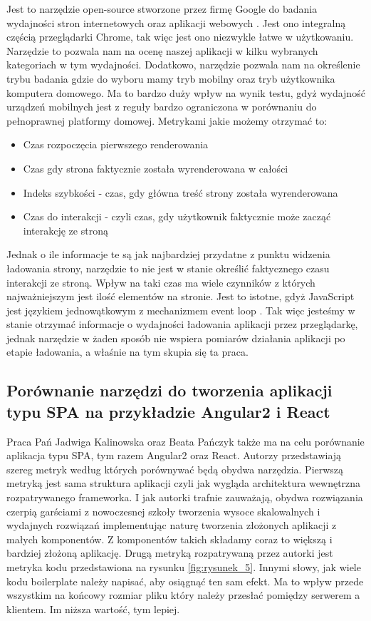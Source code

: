 Jest to narzędzie open-source stworzone przez firmę Google do badania wydajności stron internetowych oraz aplikacji webowych \cite{lighthouse}. Jest ono integralną częścią przeglądarki Chrome, tak więc jest ono niezwykle łatwe w użytkowaniu. Narzędzie to pozwala nam na ocenę naszej aplikacji w kilku wybranych kategoriach w tym wydajności. Dodatkowo, narzędzie pozwala nam na określenie trybu badania gdzie do wyboru mamy tryb mobilny oraz tryb użytkownika komputera domowego. Ma to bardzo duży wpływ na wynik testu, gdyż wydajność urządzeń mobilnych jest z reguły bardzo ograniczona w porównaniu do pełnoprawnej platformy domowej. Metrykami jakie możemy otrzymać to:
\begin{itemize}
	\item Czas rozpoczęcia pierwszego renderowania
	\item Czas gdy strona faktycznie została wyrenderowana w całości
	\item Indeks szybkości - czas, gdy główna treść strony została wyrenderowana
	\item Czas do interakcji - czyli czas, gdy użytkownik faktycznie może zacząć interakcję ze stroną
\end{itemize}

Jednak o ile informacje te są jak najbardziej przydatne z punktu widzenia ładowania strony,
narzędzie to nie jest w stanie określić faktycznego czasu interakcji ze stroną.
Wpływ na taki czas ma wiele czynników z których najważniejszym jest ilość elementów na stronie.
Jest to istotne, gdyż JavaScript jest językiem jednowątkowym z mechanizmem event loop \cite{you-dont-know-js}.
Tak więc jesteśmy w stanie otrzymać informacje o wydajności ładowania aplikacji przez przeglądarkę,
jednak narzędzie w żaden sposób nie wspiera pomiarów działania aplikacji po etapie ładowania, a właśnie na tym skupia się ta praca.

\subsection{Porównanie narzędzi do tworzenia aplikacji typu SPA na przykładzie Angular2 i React}

Praca Pań Jadwiga Kalinowska oraz Beata Pańczyk \cite{polibuda} także ma na celu porównanie aplikacja typu SPA, tym razem Angular2 oraz React.
Autorzy przedstawiają szereg metryk według których porównywać będą obydwa narzędzia.
Pierwszą metryką jest sama struktura aplikacji czyli jak wygląda architektura wewnętrzna rozpatrywanego frameworka.
I jak autorki trafnie zauważają, obydwa rozwiązania czerpią garściami z nowoczesnej szkoły tworzenia wysoce skalowalnych i wydajnych rozwiązań implementując naturę tworzenia złożonych aplikacji z małych komponentów.
Z komponentów takich składamy coraz to większą i bardziej złożoną aplikację.
Drugą metryką rozpatrywaną przez autorki jest metryka kodu przedstawiona na rysunku \ref{fig:rysunek_5}.
Innymi słowy, jak wiele kodu boilerplate należy napisać, aby osiągnąć ten sam efekt.
Ma to wpływ przede wszystkim na końcowy rozmiar pliku który należy przesłać pomiędzy serwerem a klientem.
Im niższa wartość, tym lepiej.

